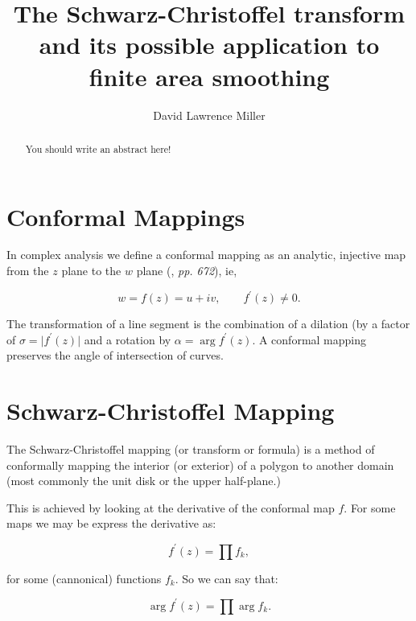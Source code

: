 \documentclass[a4paper,10pt]{amsart}
\title{The Schwarz-Christoffel transform and its possible application to finite area smoothing}
\author{David Lawrence Miller}
\newcommand{\sch}{Schwarz-Christoffel }
\newcommand{\fprime}{f^\prime(z)}
\begin{document}
 
\begin{abstract}
You should write an abstract here!

\end{abstract}
 
 
\newtheorem{thm}{Theorem}[section]
 
\newtheorem{defn}{Definition}[section]
 
\maketitle
 
\section{Conformal Mappings}

In complex analysis we define a conformal mapping as an analytic, injective map from the $z$ plane to the $w$ plane (\cite{handbuch}, \emph{pp. 672}), ie,

\begin{equation*}
w=f(z)=u+iv, \qquad f^\prime(z) \neq 0.
\end{equation*} 

The transformation of a line segment is the combination of a dilation (by a factor of $\sigma=\vert f^\prime(z) \vert$ and a rotation by $\alpha = \arg f^\prime(z)$. A conformal mapping preserves the angle of intersection of curves.

\section{\sch Mapping}

The \sch mapping (or transform or formula) is a method of conformally mapping the interior (or exterior) of a polygon to another domain (most commonly the unit disk or the upper half-plane.)

This is achieved by looking at the derivative of the conformal map $f$. For some maps we may be express the derivative as:

\begin{equation}
\fprime = \prod f_k,
\end{equation}

for some (cannonical) functions $f_k$. So we can say that:

\begin{equation}
\arg \fprime = \prod \arg f_k.
\end{equation}
\end{document}
